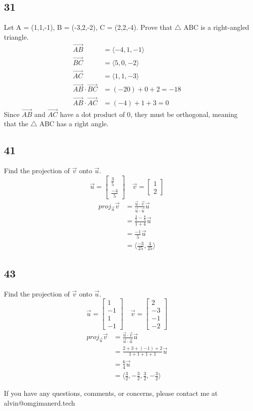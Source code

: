 \documentclass{math}
\begin{document}
\subsection*{31}
Let A = (1,1,-1), B = (-3,2,-2), C = (2,2,-4). Prove that \( \triangle \) ABC is
a right-angled triangle.
\begin{align*}
  \vec{AB} &= \langle-4,1,-1\rangle \\
  \vec{BC} &= \langle5,0,-2\rangle \\
  \vec{AC} &= \langle1,1,-3\rangle \\
  \vec{AB}\cdot\vec{BC} &= (-20)+0+2 = -18 \\
  \vec{AB}\cdot\vec{AC} &= (-4)+1+3 = 0
\end{align*}
Since \( \vec{AB} \) and \( \vec{AC} \) have a dot product of 0, they must be
orthogonal, meaning that the \( \triangle \) ABC has a right angle.

\subsection*{41}
Find the projection of \( \vec{v} \) onto \( \vec{u} \).
\[ \vec{u} = \begin{bmatrix}\frac{3}{5} \\ \frac{-4}{5}\end{bmatrix}\quad
  \vec{v} = \begin{bmatrix}1 \\ 2\end{bmatrix} \]
\begin{align*}
  proj_{\vec{u}}\vec{v} &=
    \frac{\vec{u}\cdot\vec{v}}{\vec{u}\cdot\vec{u}}\vec{u} \\
  &= \frac{\frac{3}{5}-\frac{8}{5}}{1+4}\vec{u} \\
  &= \frac{-1}{5}\vec{u} \\
  &= \langle\frac{-3}{25},\frac{4}{25}\rangle
\end{align*}

\subsection*{43}
Find the projection of \( \vec{v} \) onto \( \vec{u} \).
\[ \vec{u} = \begin{bmatrix}1 \\ -1 \\ 1 \\ -1\end{bmatrix}\quad
  \vec{v} = \begin{bmatrix}2 \\ -3 \\ -1 \\ -2\end{bmatrix} \]
\begin{align*}
  proj_{\vec{u}}\vec{v} &=
    \frac{\vec{u}\cdot\vec{v}}{\vec{u}\cdot\vec{u}}\vec{u} \\
  &= \frac{2+3+(-1)+2}{1+1+1+1}\vec{u} \\
  &= \frac{6}{4}\vec{u} \\
  &= \langle\frac{3}{2},-\frac{3}{2},\frac{3}{2},-\frac{3}{2}\rangle
\end{align*}

\begin{center}
  If you have any questions, comments, or concerns, please contact me at
  alvin@omgimanerd.tech
\end{center}
\end{document}

